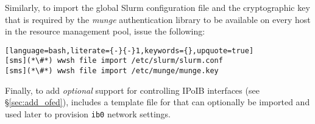 \noindent Similarly, to import the global Slurm configuration file and the cryptographic
key that is required by the {\em munge} authentication library to be available
on every host in the resource management pool, issue the following:

\begin{lstlisting}[language=bash,literate={-}{-}1,keywords={},upquote=true]
[sms](*\#*) wwsh file import /etc/slurm/slurm.conf
[sms](*\#*) wwsh file import /etc/munge/munge.key
\end{lstlisting}

\noindent Finally, to add {\em optional} support for controlling IPoIB
interfaces (see \S\ref{sec:add_ofed}), \OHPC{} includes a
template file for \Warewulf{} that can optionally be imported and used later to provision
\texttt{ib0} network settings.
